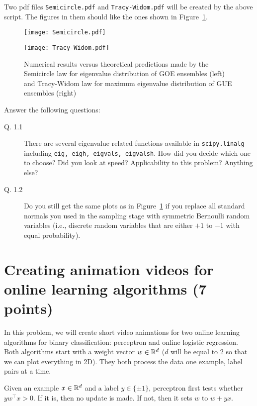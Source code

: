 \documentclass{article}
\begin{document}
Two pdf files \verb#Semicircle.pdf# and \verb#Tracy-Widom.pdf# will be created by the above script. The figures in them should like the ones
shown in Figure~\ref{rmt}.

\begin{figure}
\begin{minipage}{.4\textwidth}
\texttt{[image: Semicircle.pdf]}
\end{minipage}
\hspace{.1\textwidth}
\begin{minipage}{.4\textwidth}
\texttt{[image: Tracy-Widom.pdf]}
\end{minipage}
\caption{Numerical results versus theoretical predictions made by the Semicircle law for eigenvalue distribution of GOE ensembles (left) and Tracy-Widom law for
maximum eigenvalue distribution of GUE ensembles (right)}
\label{rmt}
\end{figure}

Answer the following questions:
\begin{description}
\item[Q. 1.1]
There are several eigenvalue related functions available in \verb#scipy.linalg# including {\tt eig, eigh, eigvals, eigvalsh}. How did you decide which one to choose?
Did you look at speed? Applicability to this problem? Anything else?
\item[Q. 1.2]
Do you still get the same plots as in Figure~\ref{rmt} if you replace all standard normals you used in the sampling stage with symmetric Bernoulli random variables (i.e.,
discrete random variables that are either $+1$ to $-1$ with equal probability).

\end{description}

\section{Creating animation videos for online learning algorithms (7 points)}

In this problem, we will create short video animations for two online learning algorithms for
binary classification: perceptron and online logistic regression.
Both algorithms start with a weight vector $w \in \mathbb{R}^d$ ($d$ will be equal to $2$ so that we can plot everything in 2D).
They both process the data one example, label pairs at a time.

Given an example $x \in \mathbb{R}^d$ and a label $y \in \{\pm 1\}$,
perceptron first tests whether $y w^\top x > 0$. If it is, then no update is made. If not, then it sets
$w$ to $w + y x$.
\end{document}
